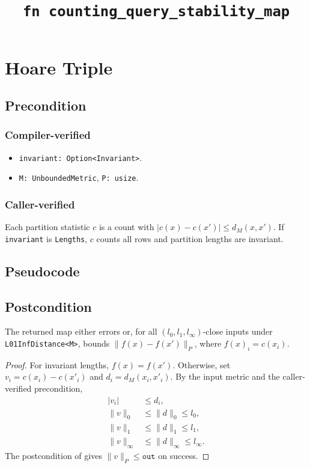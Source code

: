 \documentclass{article}
\title{\texttt{fn counting\_query\_stability\_map}}
\author{\MichaelShoemateAuthor}
\begin{document}
\maketitle
\contrib

\section{Hoare Triple}
\subsection*{Precondition}
\subsubsection*{Compiler-verified}
\begin{itemize}
    \item \texttt{invariant: Option<Invariant>}.
    \item \texttt{M: UnboundedMetric}, \texttt{P: usize}.
\end{itemize}

\subsubsection*{Caller-verified}
Each partition statistic $c$ is a count with
$|c(x)-c(x')|\le d_M(x,x')$.
If \texttt{invariant} is \texttt{Lengths}, $c$ counts all rows and
partition lengths are invariant.

\subsection*{Pseudocode}


\subsection*{Postcondition}
\begin{theorem}
    The returned map either errors or, for all
    $(l_0,l_1,l_\infty)$-close inputs under \texttt{L01InfDistance<M>},
    bounds $\|f(x)-f(x')\|_P$, where $f(x)_i=c(x_i)$.
\end{theorem}

\begin{proof}
    For invariant lengths, $f(x)=f(x')$.
    Otherwise, set $v_i=c(x_i)-c(x'_i)$ and $d_i=d_M(x_i,x'_i)$.
    By the input metric and the caller-verified precondition,
    \begin{align*}
        |v_i|&\le d_i,\\
        \|v\|_0&\le\|d\|_0\le l_0,\\
        \|v\|_1&\le\|d\|_1\le l_1,\\
        \|v\|_\infty&\le\|d\|_\infty\le l_\infty.
    \end{align*}
    The postcondition of 
    gives $\|v\|_P\le\texttt{out}$ on success.
\end{proof}
\end{document}
